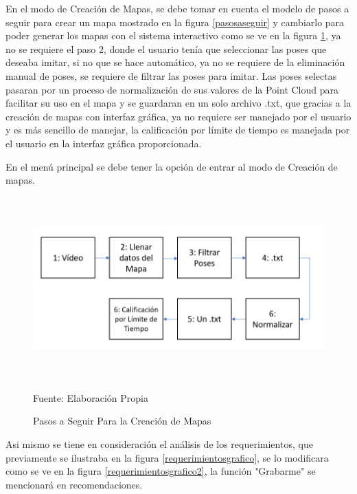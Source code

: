 En el modo de Creación de Mapas, se debe tomar en cuenta el modelo de pasos a seguir para crear un mapa mostrado en la figura \ref{pasosaseguir} y cambiarlo para poder generar los mapas con el sistema interactivo como se ve en la figura \ref{pasosaseguirpart2}, ya no se requiere el paso 2, donde el usuario tenía que seleccionar las poses que deseaba imitar, si no que se hace automático, ya no se requiere de la eliminación manual de poses, se requiere de filtrar las poses para imitar. Las poses selectas pasaran por un proceso de normalización de sus valores de la Point Cloud para facilitar su uso en el mapa y se guardaran en un solo archivo .txt, que gracias a la creación de mapas con interfaz gráfica, ya no requiere ser manejado por el usuario y es más sencillo de manejar, la calificación por límite de tiempo es manejada por el usuario en la interfaz gráfica proporcionada.

En el menú principal se debe tener la opción de entrar al modo de Creación de mapas.
\begin{figure}[t!]
	\centering
	\includegraphics[width=16cm,height=7cm,]{./Images/pasosaseguirpart2.png}
	\caption{Pasos a Seguir Para la Creación de Mapas}
	\footnotesize Fuente: Elaboración Propia
	\label{pasosaseguirpart2}
\end{figure}

Asi mismo se tiene en consideración el análisis de los requerimientos, que previamente se ilustraba en la figura \ref{requerimientosgrafico}, se lo modificara como se ve en la figura \ref{requerimientosgrafico2}, la función "Grabarme" se mencionará en recomendaciones.

